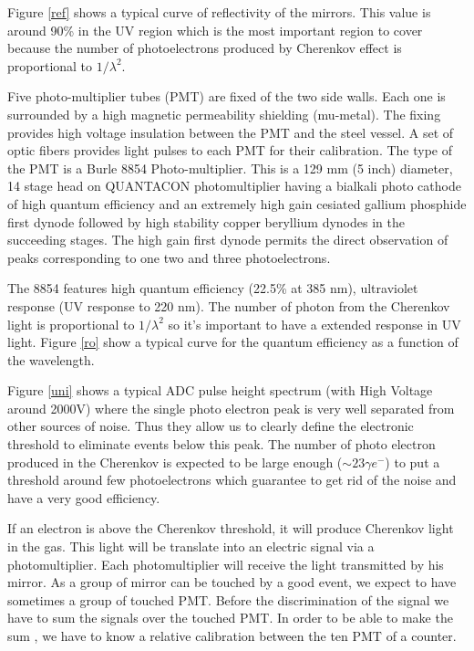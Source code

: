 \documentclass[12pt]{article}
\begin{document}
Figure \ref{ref} shows a typical curve of reflectivity of the mirrors. This
value is around 90\% in the UV region which is the most important region
to cover because the number of photoelectrons produced by Cherenkov effect
is proportional to $1/\lambda^2$.


Five photo-multiplier tubes (PMT) are fixed of the two side walls. Each one
is surrounded by a high magnetic permeability shielding (mu-metal). The
fixing provides high voltage insulation between the PMT and the steel vessel.
A set of optic fibers provides light pulses to each PMT for their 
calibration.
The type of the PMT is a Burle 8854 Photo-multiplier. This is a 129 mm
 (5 inch) diameter, 14 stage head on QUANTACON photomultiplier having 
a bialkali photo cathode of high quantum efficiency and an extremely
 high gain cesiated gallium phosphide first
dynode followed by high stability copper beryllium dynodes in the succeeding
stages. The high gain first dynode permits the direct observation of peaks 
corresponding to one two and three photoelectrons. 

The 8854 features high quantum efficiency (22.5\% at 385 nm), 
ultraviolet response (UV response to 220 nm). The number of photon from the 
Cherenkov light is proportional to $1/\lambda^2$ so it's important to have a
extended response in UV light. Figure \ref{ro} show a typical curve for
the quantum efficiency as a function of the wavelength.


Figure \ref{uni} shows a typical ADC pulse height spectrum 
(with High Voltage around 2000V) where the single
photo electron peak is very well separated from other sources of noise. Thus
they allow us to clearly define the electronic threshold to eliminate events
below this peak. The number of photo electron produced in the Cherenkov is 
expected to be large enough ($\sim 23\gamma e^{-}$) to put a threshold around
few photoelectrons which guarantee to get rid of the noise and have a very good
efficiency.


If an electron is above the Cherenkov threshold, it will produce Cherenkov 
light in the gas. This light will be translate into an electric signal 
via a photomultiplier. Each photomultiplier will receive the light 
transmitted by his mirror. As a group of mirror can be touched by a good 
event, we expect to have sometimes a group of touched PMT. Before the 
discrimination of the signal we have to sum the signals over the touched 
PMT. In order to be able to make the sum , we have to know a relative 
calibration between the ten PMT of a counter. 
\end{document}
